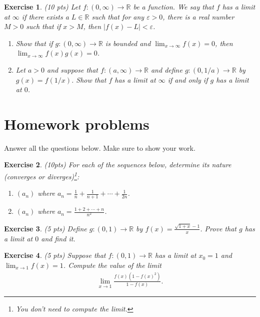 \documentclass[12pt]{article}
\newcommand{\bR}{\mathbb{R}}
\newcommand{\ra}{\rightarrow}
\theoremstyle{plain}
\newtheorem{exer}{\textbf{Exercise}}}
\theoremstyle{plain}
\begin{document}
\begin{exer}
(10 pts)
Let $f : (0, \infty ) \ra \bR$ be a function. We say that $f$ has a limit at $\infty$ if there exists a $L \in \bR$ such that for any $\varepsilon > 0$, there is a real number $M > 0$ such that if $x > M$, then $|f(x) - L| < \varepsilon$. 
	\begin{enumerate}[label=\textbf{\alph*)}]
	\item Show that if $g: (0, \infty ) \ra \bR$ is bounded and $\lim_{x \ra \infty} f(x ) = 0$, then $\lim_{x \ra \infty} f(x) g(x) = 0$.
	\item Let $a > 0$ and suppose that $f: (a, \infty ) \ra \bR$ and define $g : (0, 1/a ) \ra \bR$ by $g(x) = f(1/x)$. Show that $f$ has a limit at $\infty$ if and only if $g$ has a limit at $0$.
	\end{enumerate}
\end{exer}

\section{Homework problems}
Answer all the questions below. Make sure to show your work.

\begin{exer}
(10pts)
For each of the sequences below, determine its nature (converges or diverges)\footnote{You don't need to compute the limit.}:
	\begin{enumerate}[label=\textbf{\alph*)}]
	\item $(a_n)$ where $a_n = \frac{1}{n} + \frac{1}{n + 1} + \cdots + \frac{1}{2n}$.
	\item $(a_n)$ where $a_n = \frac{1 + 2 + \cdots + n}{n^2}$.
	\end{enumerate}
\end{exer}


\begin{exer}
(5 pts)
Define $g: (0, 1) \ra \bR$ by $f(x) = \frac{\sqrt{1 + x} - 1}{x}$. Prove that $g$ has a limit at $0$ and find it.
\end{exer}

\begin{exer}
(5 pts)
Suppose that $f: (0, 1) \ra \bR$ has a limit at $x_0 = 1$ and $\lim_{x \ra 1} f(x) = 1$. Compute the value of the limit
	\begin{align*}
	\lim_{x \ra 1} \frac{f(x) (1 - f(x)^2)}{1 - f(x)} .
	\end{align*}
\end{exer}
\end{document}
